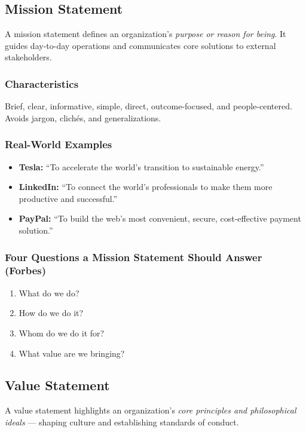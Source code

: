 \documentclass[11pt, letterpaper]{article}
\begin{document}
\subsection{Mission Statement}

A mission statement defines an organization's \textit{purpose or reason for being}. It guides day-to-day operations and communicates core solutions to external stakeholders.

\subsubsection{Characteristics}
Brief, clear, informative, simple, direct, outcome-focused, and people-centered. Avoids jargon, clichés, and generalizations.

\subsubsection{Real-World Examples}
\begin{itemize}[leftmargin=*]
  \item \textbf{Tesla:} ``To accelerate the world's transition to sustainable energy.''
  \item \textbf{LinkedIn:} ``To connect the world's professionals to make them more productive and successful.''
  \item \textbf{PayPal:} ``To build the web's most convenient, secure, cost-effective payment solution.''
\end{itemize}

\subsubsection{Four Questions a Mission Statement Should Answer (Forbes)}
\begin{enumerate}[leftmargin=*, label=\arabic*.]
  \item What do we do?
  \item How do we do it?
  \item Whom do we do it for?
  \item What value are we bringing?
\end{enumerate}

\subsection{Value Statement}

A value statement highlights an organization's \textit{core principles and philosophical ideals} --- shaping culture and establishing standards of conduct.
\end{document}
